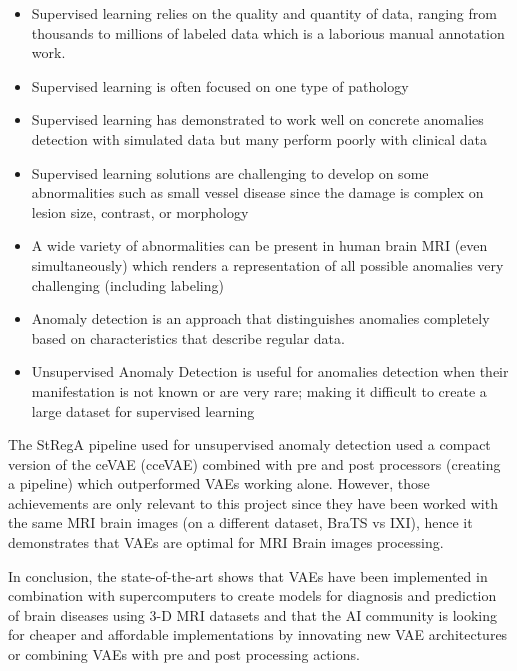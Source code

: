 \begin{itemize}
    \item Supervised learning relies on the quality and quantity of data, ranging from thousands to millions of labeled data which is a laborious manual annotation work.
    \item Supervised learning is often focused on one type of pathology
    \item Supervised learning has demonstrated to work well on concrete anomalies detection with simulated data but many perform poorly with clinical data
    \item Supervised learning solutions are challenging to develop on some abnormalities such as small vessel disease since the damage is complex on lesion size, contrast, or morphology
    \item A wide variety of abnormalities can be present in human brain MRI (even simultaneously) which renders a representation of all possible anomalies very challenging (including labeling)
    \item Anomaly detection is an approach that distinguishes anomalies completely based on characteristics that describe regular data.
    \item Unsupervised Anomaly Detection is useful for anomalies detection when their manifestation is not known or are very rare; making it difficult to create a large dataset for supervised learning
\end{itemize}

The StRegA pipeline used for unsupervised anomaly detection used a compact version of the ceVAE (cceVAE) combined with pre and post processors (creating a pipeline) which outperformed VAEs working alone. However, those achievements are only relevant to this project since they have been worked with the same MRI brain images (on a different dataset, BraTS vs IXI), hence it demonstrates that VAEs are optimal for MRI Brain images processing.

In conclusion, the state-of-the-art shows that VAEs have been implemented in combination with supercomputers to create models for diagnosis and prediction of brain diseases using 3-D MRI datasets and that the AI community is looking for cheaper and affordable implementations by innovating new VAE architectures or combining VAEs with pre and post processing actions.